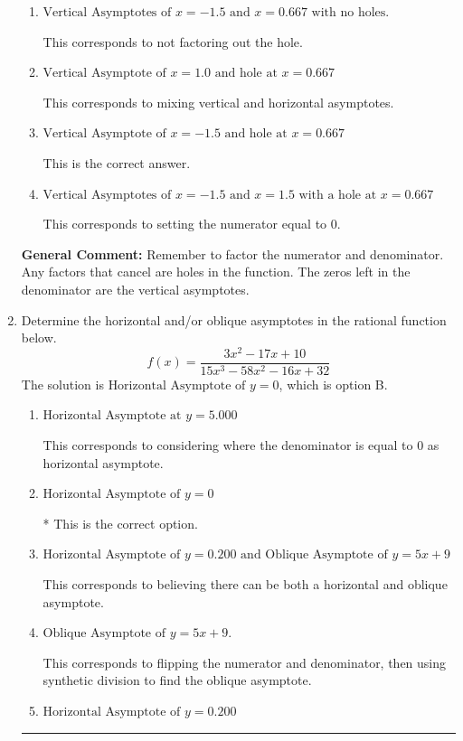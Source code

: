 \documentclass{extbook}[14pt]
\newcommand{\litem}[1]{\item #1

\rule{\textwidth}{0.4pt}}
\begin{document}
\begin{enumerate}
{\begin{enumerate}[label=\Alph*.]
This corresponds to considering where the denominator is equal to 0 as holes.
\item \( \text{Vertical Asymptotes of } x = -1.5 \text{ and } x = 0.667 \text{ with no holes.} \)

This corresponds to not factoring out the hole.
\item \( \text{Vertical Asymptote of } x = 1.0 \text{ and hole at } x = 0.667 \)

This corresponds to mixing vertical and horizontal asymptotes.
\item \( \text{Vertical Asymptote of } x = -1.5 \text{ and hole at } x = 0.667 \)

This is the correct answer.
\item \( \text{Vertical Asymptotes of } x = -1.5 \text{ and } x = 1.5 \text{ with a hole at } x = 0.667 \)

This corresponds to setting the numerator equal to 0.
\end{enumerate}

\textbf{General Comment:} Remember to factor the numerator and denominator. Any factors that cancel are holes in the function. The zeros left in the denominator are the vertical asymptotes.
}
\litem{
Determine the horizontal and/or oblique asymptotes in the rational function below.
\[ f(x) = \frac{3x^{2} -17 x + 10}{15x^{3} -58 x^{2} -16 x + 32} \]The solution is \( \text{Horizontal Asymptote of } y = 0 \), which is option B.\begin{enumerate}[label=\Alph*.]
\item \( \text{Horizontal Asymptote at } y = 5.000 \)

This corresponds to considering where the denominator is equal to 0 as horizontal asymptote.
\item \( \text{Horizontal Asymptote of } y = 0 \)

* This is the correct option.
\item \( \text{Horizontal Asymptote of } y = 0.200 \text{ and Oblique Asymptote of } y = 5x + 9 \)

This corresponds to believing there can be both a horizontal and oblique asymptote.
\item \( \text{Oblique Asymptote of } y = 5x + 9. \)

This corresponds to flipping the numerator and denominator, then using synthetic division to find the oblique asymptote.
\item \( \text{Horizontal Asymptote of } y = 0.200  \)


\end{enumerate}}
\end{enumerate}
\end{document}
